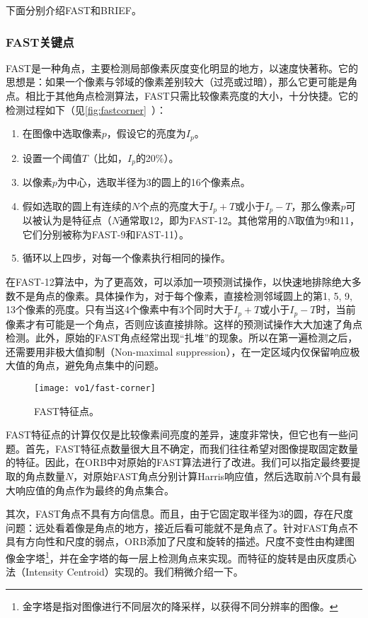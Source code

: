 下面分别介绍FAST和BRIEF。
\subsubsection{FAST关键点}

FAST是一种角点，主要检测局部像素灰度变化明显的地方，以速度快著称。它的思想是：如果一个像素与邻域的像素差别较大（过亮或过暗），那么它更可能是角点。相比于其他角点检测算法，FAST只需比较像素亮度的大小，十分快捷。它的检测过程如下（见\autoref{fig:fastcorner}~）：

\begin{enumerate}
\item 在图像中选取像素$p$，假设它的亮度为$I_{p}$。
\item 设置一个阈值$T$（比如，$I_{p}$的20\%）。
\item 以像素$p$为中心，选取半径为3的圆上的16个像素点。
\item 假如选取的圆上有连续的$N$个点的亮度大于$I_{p}+T$或小于$I_{p}-T$，那么像素$p$可以被认为是特征点（$N$通常取12，即为FAST-12。其他常用的$N$取值为9和11，它们分别被称为FAST-9和FAST-11）。
\item 循环以上四步，对每一个像素执行相同的操作。
\end{enumerate}

在FAST-12算法中，为了更高效，可以添加一项预测试操作，以快速地排除绝大多数不是角点的像素。具体操作为，对于每个像素，直接检测邻域圆上的第1, 5, 9, 13个像素的亮度。只有当这4个像素中有3个同时大于$I_{p}+T$或小于$I_{p}-T$时，当前像素才有可能是一个角点，否则应该直接排除。这样的预测试操作大大加速了角点检测。此外，原始的FAST角点经常出现“扎堆”的现象。所以在第一遍检测之后，还需要用非极大值抑制（Non-maximal suppression），在一定区域内仅保留响应极大值的角点，避免角点集中的问题。

\begin{figure}[!ht]
	\centering
	\texttt{[image: vo1/fast-corner]}
	\caption{FAST特征点\textsuperscript{\cite{rosten2006machine}}。}
	\label{fig:fastcorner}
\end{figure}

FAST特征点的计算仅仅是比较像素间亮度的差异，速度非常快，但它也有一些问题。首先，FAST特征点数量很大且不确定，而我们往往希望对图像提取固定数量的特征。因此，在ORB中对原始的FAST算法进行了改进。我们可以指定最终要提取的角点数量$N$，对原始FAST角点分别计算Harris响应值，然后选取前$N$个具有最大响应值的角点作为最终的角点集合。

其次，FAST角点不具有方向信息。而且，由于它固定取半径为3的圆，存在尺度问题：远处看着像是角点的地方，接近后看可能就不是角点了。针对FAST角点不具有方向性和尺度的弱点，ORB添加了尺度和旋转的描述。尺度不变性由构建图像金字塔\footnote{金字塔是指对图像进行不同层次的降采样，以获得不同分辨率的图像。}，并在金字塔的每一层上检测角点来实现。而特征的旋转是由灰度质心法（Intensity Centroid）实现的。我们稍微介绍一下。

